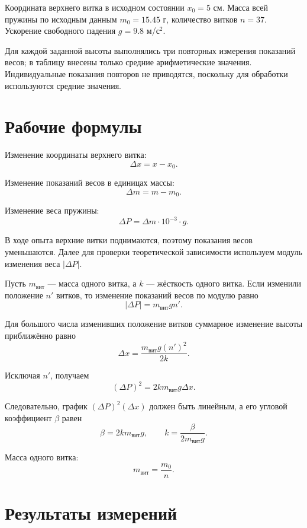\documentclass[12pt]{article}
\begin{document}
    Координата верхнего витка в исходном состоянии $x_0 = 5$ см. Масса всей пружины по исходным данным $m_0 = 15.45$ г, количество витков $n = 37$. Ускорение свободного падения $g = 9.8$ м/с$^2$.

    Для каждой заданной высоты выполнялись три повторных измерения показаний весов; в таблицу внесены только средние арифметические значения. Индивидуальные показания повторов не приводятся, поскольку для обработки используются средние значения.

    \section{Рабочие формулы}

    Изменение координаты верхнего витка:
    \[
        \Delta x = x - x_0.
    \]

    Изменение показаний весов в единицах массы:
    \[
        \Delta m = m - m_0.
    \]

    Изменение веса пружины:
    \[
        \Delta P = \Delta m \cdot 10^{-3} \cdot g.
    \]

    В ходе опыта верхние витки поднимаются, поэтому показания весов уменьшаются. Далее для проверки теоретической зависимости используем модуль изменения веса $|\Delta P|$.

    Пусть $m_{\text{вит}}$ — масса одного витка, а $k$ — жёсткость одного витка. Если изменили положение $n'$ витков, то изменение показаний весов по модулю равно
    \[
        |\Delta P| = m_{\text{вит}} g n'.
    \]

    Для большого числа изменивших положение витков суммарное изменение высоты приближённо равно
    \[
        \Delta x = \frac{m_{\text{вит}} g (n')^2}{2k}.
    \]

    Исключая $n'$, получаем
    \[
        (\Delta P)^2 = 2 k m_{\text{вит}} g \Delta x.
    \]

    Следовательно, график $(\Delta P)^2(\Delta x)$ должен быть линейным, а его угловой коэффициент $\beta$ равен
    \[
        \beta = 2 k m_{\text{вит}} g,
        \qquad
        k = \frac{\beta}{2 m_{\text{вит}} g}.
    \]

    Масса одного витка:
    \[
        m_{\text{вит}} = \frac{m_0}{n}.
    \]

    \section{Результаты измерений}
\end{document}

